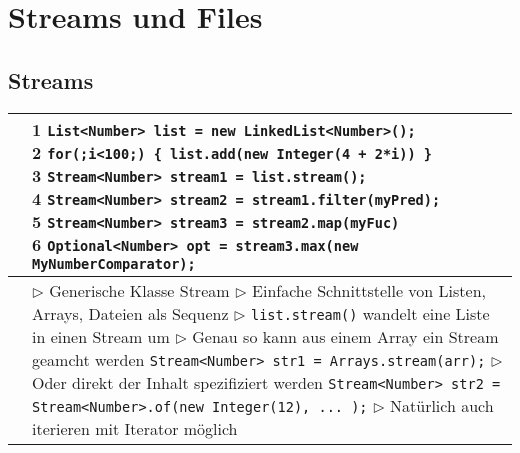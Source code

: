 \section{Streams und Files}


\subsection{Streams}


	\begin{table}[H]
	\label{Streams}
	\begin{tabular}{ | p{4cm} p{13.5cm} | }
	

	\hline
	\makecell[l]{Beispiel: Streams} & 
	\makecell[l]
	{
	\hspace{0.3cm}  1 \hspace{0.3cm} \texttt{List<Number> list = new LinkedList<Number>();} \\
	\hspace{0.3cm}  2 \hspace{0.3cm} \texttt{for(;i<100;) \{ list.add(new Integer(4 + 2*i)) \}} \\
	\hspace{0.3cm}  3 \hspace{0.3cm} \texttt{Stream<Number> stream1 = list.stream();} \\
	\hspace{0.3cm}  4 \hspace{0.3cm} \texttt{Stream<Number> stream2 = stream1.filter(myPred);} \\
	\hspace{0.3cm}  5 \hspace{0.3cm} \texttt{Stream<Number> stream3 = stream2.map(myFuc)} \\
	\hspace{0.3cm}  6 \hspace{0.3cm} \texttt{Optional<Number> opt = stream3.max(new MyNumberComparator);} \\
	} 	\\ \hline


	\makecell[l]{Funktion} & 
	\makecell[l]
	{
	$\rhd$ Generische Klasse Stream
	$\rhd$ Einfache Schnittstelle von Listen, Arrays, Dateien als Sequenz \\
	$\rhd$ \texttt{list.stream()} wandelt eine Liste in einen Stream um \\
	$\rhd$ Genau so kann aus einem Array ein Stream geamcht werden \\
	\hspace{0.5cm} \texttt{Stream<Number> str1 = Arrays.stream(arr);} \\
	$\rhd$ Oder direkt der Inhalt spezifiziert werden \\
	\hspace{0.5cm} \texttt{Stream<Number> str2 = Stream<Number>.of(new Integer(12), ... );} \\
	$\rhd$ Natürlich auch iterieren mit Iterator möglich \\
	} 	\\ \hline



\end{tabular}
\end{table}
